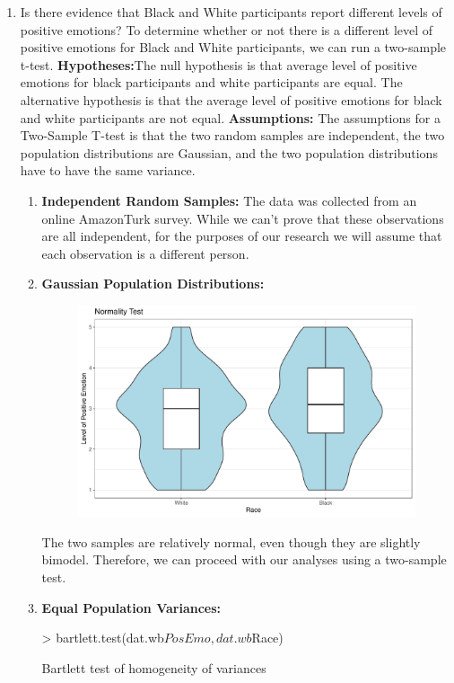 \documentclass{article}
\begin{document}
\begin{enumerate}
\item Is there evidence that Black and White participants report different levels of positive emotions?
\newline To determine whether or not there is a different level of positive emotions for Black and White participants, we can run a two-sample t-test. 
\newline \textbf{Hypotheses:}The null hypothesis is that average level of positive emotions for black participants and white participants are equal. The alternative hypothesis is that the average level of positive emotions for black and white participants are not equal. 
\newline \textbf{Assumptions:} The assumptions for a Two-Sample T-test is that the two random samples are independent, the two population distributions are Gaussian, and the two population distributions have to have the same variance. 
\begin{enumerate}
\item \textbf{Independent Random Samples:} The data was collected from an online AmazonTurk survey. While we can't prove that these observations are all independent, for the purposes of our research we will assume that each observation is a different person. 
\item \textbf{Gaussian Population Distributions:} 
\begin{figure}[H]
\includegraphics{finalExam-031}
\end{figure}
The two samples are relatively normal, even though they are slightly bimodel. Therefore, we can proceed with our analyses using a two-sample test. 
\item \textbf{Equal Population Variances:}
\begin{Schunk}
\begin{Sinput}
> bartlett.test(dat.wb$PosEmo, dat.wb$Race)
\end{Sinput}
\begin{Soutput}
	Bartlett test of homogeneity of variances


\end{Soutput}
\end{Schunk}
\end{enumerate}
\end{enumerate}
\end{document}
